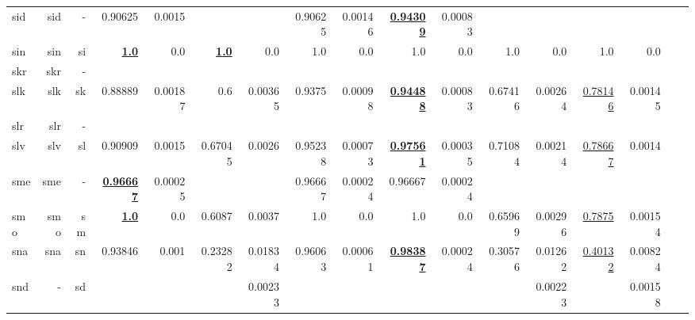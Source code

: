 \documentclass[11pt]{article}
\begin{document}
\begin{table*}[h]
{\begin{tabular}{lrrrrrrrrrrrrrrrr}
sid         & sid         & -         & 0.90625         & 0.0015         &          &          & 0.90625         & 0.00146         & \textbf{\underline{0.94309}}         & 0.00083         &          &          &          &          \\
sin         & sin         & si         & \textbf{\underline{1.0}}         & 0.0         & \textbf{\underline{1.0}}         & 0.0         & 1.0         & 0.0         & 1.0         & 0.0         & 1.0         & 0.0         & 1.0         & 0.0         \\
skr         & skr         & -         &          &          &          &          &          &          &          &          &          &          &          &          \\
slk         & slk         & sk         & 0.88889         & 0.00187         & 0.6         & 0.00365         & 0.9375         & 0.00098         & \textbf{\underline{0.94488}}         & 0.00083         & 0.67416         & 0.00264         & \underline{0.78146}         & 0.00145         \\
slr         & slr         & -         &          &          &          &          &          &          &          &          &          &          &          &          \\
slv         & slv         & sl         & 0.90909         & 0.0015         & 0.67045         & 0.0026         & 0.95238         & 0.00073         & \textbf{\underline{0.97561}}         & 0.00035         & 0.71084         & 0.00214         & \underline{0.78667}         & 0.0014         \\
sme         & sme         & -         & \textbf{\underline{0.96667}}         & 0.00025         &          &          & 0.96667         & 0.00024         & 0.96667         & 0.00024         &          &          &          &          \\
smo         & smo         & sm         & \textbf{\underline{1.0}}         & 0.0         & 0.6087         & 0.0037         & 1.0         & 0.0         & 1.0         & 0.0         & 0.65969         & 0.00296         & \underline{0.7875}         & 0.00154         \\
sna         & sna         & sn         & 0.93846         & 0.001         & 0.23282         & 0.01834         & 0.96063         & 0.00061         & \textbf{\underline{0.98387}}         & 0.00024         & 0.30576         & 0.01262         & \underline{0.40132}         & 0.00824         \\
snd         & -         & sd         &          &          &          & 0.00233         &          &          &          &          &          & 0.00223         &          & 0.00158         \\

\end{tabular}}
\end{table*}
\end{document}
